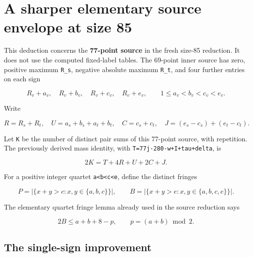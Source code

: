 \documentclass[10pt,a4paper]{article}
\theoremstyle{definition}
\begin{document}
\clearpage
\hypertarget{a-sharper-elementary-source-envelope-at-size-85}{%
\section{A sharper elementary source envelope at size
85}\label{a-sharper-elementary-source-envelope-at-size-85}}

This deduction concerns the \textbf{77-point source} in the fresh
size-85 reduction. It does not use the computed fixed-label tables. The
69-point inner source has zero,\allowbreak{} positive maximum
\texttt{R\_\allowbreak{}\allowbreak{}s},\allowbreak{} negative absolute maximum
\texttt{R\_\allowbreak{}\allowbreak{}t},\allowbreak{} and four further entries on each sign

\[
 R_v+\allowbreak{}a_v,\allowbreak{}\quad R_v+\allowbreak{}b_v,\allowbreak{}\quad R_v+\allowbreak{}c_v,\allowbreak{}\quad R_v+\allowbreak{}e_v,\allowbreak{}
 \qquad 1\le a_v<b_v<c_v<e_v.
\]

Write

\[
 R=\allowbreak{}R_s+\allowbreak{}R_t,\allowbreak{}\quad U=\allowbreak{}a_s+\allowbreak{}b_s+\allowbreak{}a_t+\allowbreak{}b_t,\allowbreak{}\quad C=\allowbreak{}c_s+\allowbreak{}c_t,\allowbreak{}
 \quad J=\allowbreak{}(e_s-c_s)+\allowbreak{}(e_t-c_t).
\]

Let \texttt{K} be the number of distinct pair sums of
this 77-point source,\allowbreak{} with repetition. The previously derived mass
identity,\allowbreak{} with \texttt{T=\allowbreak{}77j-280-w+\allowbreak{}I+\allowbreak{}tau+\allowbreak{}delta},\allowbreak{} is

\[
 2K=\allowbreak{}T+\allowbreak{}4R+\allowbreak{}U+\allowbreak{}2C+\allowbreak{}J.                                      \tag{1}
\]

For a positive integer quartet \texttt{a<b<c<e},\allowbreak{} define
the distinct fringes

\[
 P=\allowbreak{}|\{x+\allowbreak{}y>c:x,\allowbreak{}y\in\{a,\allowbreak{}b,\allowbreak{}c\}\}|,\allowbreak{}
 \qquad B=\allowbreak{}|\{x+\allowbreak{}y>e:x,\allowbreak{}y\in\{a,\allowbreak{}b,\allowbreak{}c,\allowbreak{}e\}\}|.
\]

The elementary quartet fringe lemma already used in the source reduction
says

\[
 2B\le a+\allowbreak{}b+\allowbreak{}8-p,\allowbreak{}\qquad p=\allowbreak{}(a+\allowbreak{}b)\bmod2.                 \tag{2}
\]

\hypertarget{the-single-sign-improvement}{%
\subsection{The single-sign
improvement}\label{the-single-sign-improvement}}
\end{document}
